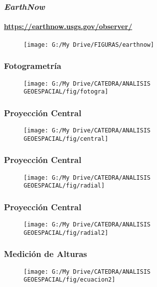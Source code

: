 \documentclass[14pt]{beamer}
\begin{document}
\begin{frame}
\frametitle{\emph{EarthNow}}
\framesubtitle{\url{https://earthnow.usgs.gov/observer/}}
 \begin{figure}
    \centering
    \texttt{[image: G:/My Drive/FIGURAS/earthnow]}
  \end{figure}
  \end{frame}
\begin{frame}
\frametitle{Fotogrametría} 
 \begin{figure}
    \centering
    \texttt{[image: G:/My Drive/CATEDRA/ANALISIS GEOESPACIAL/fig/fotogra]}
  \end{figure}
\end{frame}
\begin{frame}
\frametitle{Proyección Central} 
 \begin{figure}
    \centering
    \texttt{[image: G:/My Drive/CATEDRA/ANALISIS GEOESPACIAL/fig/central]}
  \end{figure}
\end{frame}
\begin{frame}
\frametitle{Proyección Central} 
 \begin{figure}
    \centering
    \texttt{[image: G:/My Drive/CATEDRA/ANALISIS GEOESPACIAL/fig/radial]}
  \end{figure}
\end{frame}
\begin{frame}
\frametitle{Proyección Central} 
 \begin{figure}
    \centering
    \texttt{[image: G:/My Drive/CATEDRA/ANALISIS GEOESPACIAL/fig/radial2]}
  \end{figure}
\end{frame}
\begin{frame}
\frametitle{Medición de Alturas} 
 \begin{figure}
    \centering
    \texttt{[image: G:/My Drive/CATEDRA/ANALISIS GEOESPACIAL/fig/ecuacion2]}
  \end{figure}
\end{frame}
\end{document}
